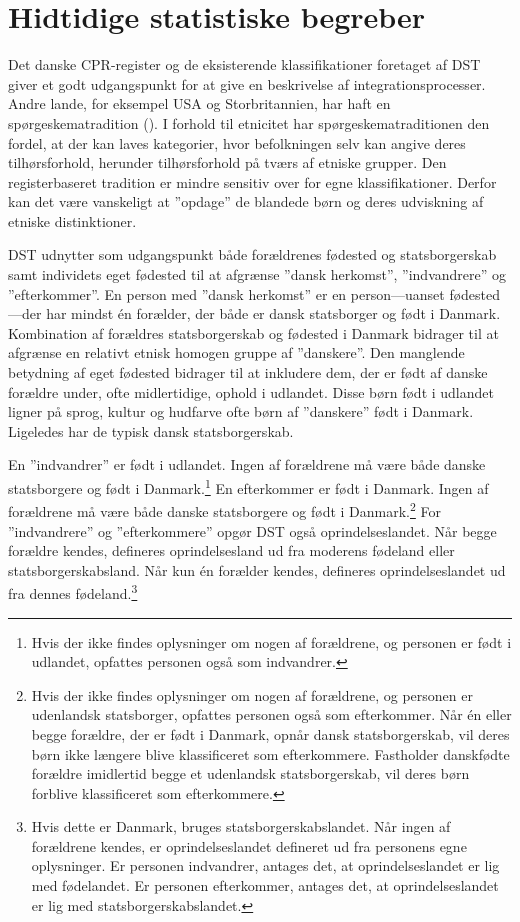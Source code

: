 \documentclass[
]{book}
\begin{document}
\section{Hidtidige statistiske begreber}\label{hidtidige-statistiske-begreber}

Det danske CPR-register og de eksisterende klassifikationer foretaget af DST giver et godt udgangspunkt for at give en beskrivelse af integrationsprocesser. Andre lande, for eksempel USA og Storbritannien, har haft en spørgeskematradition (). I forhold til etnicitet har spørgeskematraditionen den fordel, at der kan laves kategorier, hvor befolkningen selv kan angive deres tilhørsforhold, herunder tilhørsforhold på tværs af etniske grupper. Den registerbaseret tradition er mindre sensitiv over for egne klassifikationer. Derfor kan det være vanskeligt at ''opdage'' de blandede børn og deres udviskning af etniske distinktioner.

DST udnytter som udgangspunkt både forældrenes fødested og statsborgerskab samt individets eget fødested til at afgrænse ''dansk herkomst'', ''indvandrere'' og ''efterkommer''. En person med ''dansk herkomst'' er en person---uanset fødested---der har mindst én forælder, der både er dansk statsborger og født i Danmark. Kombination af forældres statsborgerskab og fødested i Danmark bidrager til at afgrænse en relativt etnisk homogen gruppe af ''danskere''. Den manglende betydning af eget fødested bidrager til at inkludere dem, der er født af danske forældre under, ofte midlertidige, ophold i udlandet. Disse børn født i udlandet ligner på sprog, kultur og hudfarve ofte børn af ''danskere'' født i Danmark. Ligeledes har de typisk dansk statsborgerskab.

En ''indvandrer'' er født i udlandet. Ingen af forældrene må være både danske statsborgere og født i Danmark.\footnote{Hvis der ikke findes oplysninger om nogen af forældrene, og personen er født i udlandet, opfattes personen også som indvandrer.} En efterkommer er født i Danmark. Ingen af forældrene må være både danske statsborgere og født i Danmark.\footnote{Hvis der ikke findes oplysninger om nogen af forældrene, og personen er udenlandsk statsborger, opfattes personen også som efterkommer. Når én eller begge forældre, der er født i Danmark, opnår dansk statsborgerskab, vil deres børn ikke længere blive klassificeret som efterkommere. Fastholder danskfødte forældre imidlertid begge et udenlandsk statsborgerskab, vil deres børn forblive klassificeret som efterkommere.} For ''indvandrere'' og ''efterkommere'' opgør DST også oprindelseslandet. Når begge forældre kendes, defineres oprindelsesland ud fra moderens fødeland eller statsborgerskabsland. Når kun én forælder kendes, defineres oprindelseslandet ud fra dennes fødeland.\footnote{Hvis dette er Danmark, bruges statsborgerskabslandet. Når ingen af forældrene kendes, er oprindelseslandet defineret ud fra personens egne oplysninger. Er personen indvandrer, antages det, at oprindelseslandet er lig med fødelandet. Er personen efterkommer, antages det, at oprindelseslandet er lig med statsborgerskabslandet.}
\end{document}
